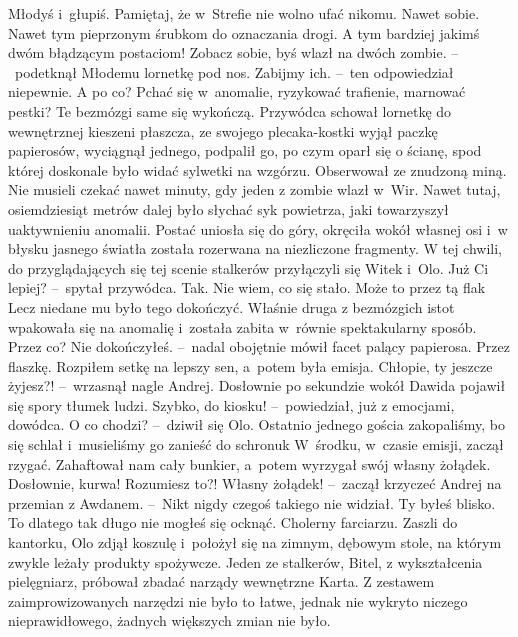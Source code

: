 \documentclass[../MAIN.tex]{subfiles}
\begin{document}
\dd
\sd
\xx Młodyś i~głupiś. Pamiętaj, że w~Strefie nie wolno ufać nikomu. Nawet sobie. Nawet tym pieprzonym śrubkom do oznaczania drogi. A tym bardziej jakimś dwóm błądzącym postaciom! Zobacz sobie, byś wlazł na dwóch zombie. --~podetknął Młodemu lornetkę pod nos.
\xx Zabijmy ich. --~ten odpowiedział niepewnie.
\xx A po co? Pchać się w~anomalie, ryzykować trafienie, marnować pestki? Te bezmózgi same się wykończą.
\qd
\hspace{10.5em}Przywódca schował lornetkę do wewnętrznej kieszeni płaszcza, ze swojego plecaka-kostki wyjął paczkę papierosów, wyciągnął jednego, podpalił go, po czym oparł się o ścianę, spod której doskonale było widać sylwetki na wzgórzu. Obserwował ze znudzoną miną. Nie musieli czekać nawet minuty, gdy jeden z zombie wlazł w~Wir. Nawet tutaj, osiemdziesiąt metrów dalej było słychać syk powietrza, jaki towarzyszył uaktywnieniu anomalii. Postać uniosła się do góry, okręciła wokół własnej osi i~w błysku jasnego światła została rozerwana na niezliczone fragmenty.
W tej chwili, do przyglądających się tej scenie stalkerów przyłączyli się Witek i~Olo.
\dd
\sd
\xx Już Ci lepiej? --~spytał przywódca.
\xx Tak. Nie wiem, co się stało. Może to przez tą fla\3k
\qd
\hspace{24em} Lecz niedane mu było tego dokończyć. Właśnie druga z bezmózgich istot wpakowała się na anomalię i~została zabita w~równie spektakularny sposób.
\dd
\sd
\xx Przez co? Nie dokończyłeś. --~nadal obojętnie mówił facet palący papierosa.
\xx Przez flaszkę. Rozpiłem setkę na lepszy sen, a~potem była emisja.
\xx Chłopie, ty jeszcze żyjesz?! --~wrzasnął nagle Andrej.
\qd
\hspace{24.5em} Dosłownie po sekundzie wokół Dawida pojawił się spory tłumek ludzi.
\dd
\sd
\xx Szybko, do kiosku! --~powiedział, już z emocjami, dowódca.
\xx O co chodzi? --~dziwił się Olo.
\xx Ostatnio jednego gościa zakopaliśmy, bo się schlał i~musieliśmy go zanieść do schronu\3k W~środku, w~czasie emisji, zaczął rzygać. Zahaftował nam cały bunkier, a~potem wyrzygał swój własny żołądek. Dosłownie, kurwa! Rozumiesz to?! Własny żołądek! --~zaczął krzyczeć Andrej na przemian z Awdanem. --~Nikt nigdy czegoś takiego nie widział. Ty byłeś blisko. To dlatego tak długo nie mogłeś się ocknąć. Cholerny farciarzu.
\qd
\hspace{9.6em} Zaszli do kantorku, Olo zdjął koszulę i~położył się na zimnym, dębowym stole, na którym zwykle leżały produkty spożywcze. Jeden ze stalkerów, Bitel, z wykształcenia pielęgniarz, próbował zbadać narządy wewnętrzne Karta. Z zestawem zaimprowizowanych narzędzi nie było to łatwe, jednak nie wykryto niczego nieprawidłowego, żadnych większych zmian nie było.
\end{document}
